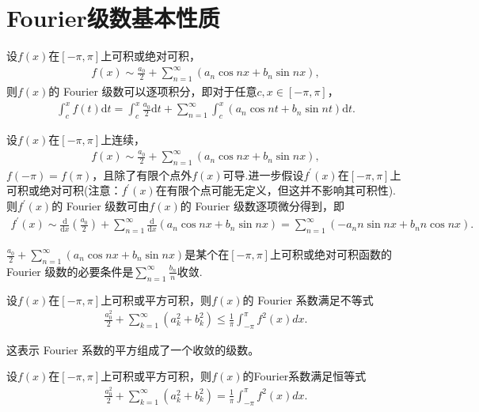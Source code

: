 \documentclass[../../main.tex]{subfiles}
\begin{document}
\section{Fourier级数基本性质}

\begin{theorem}[Fourier级数的逐项积分定理]\label{theorem:Fourier级数的逐项积分定理}
设$f(x)$在$[-\pi,\pi]$上可积或绝对可积，
\begin{align*}
f(x)\sim\frac{a_0}{2}+\sum_{n = 1}^{\infty}(a_n\cos nx + b_n\sin nx),
\end{align*}
则$f(x)$的 Fourier 级数可以逐项积分，即对于任意$c,x\in[-\pi,\pi]$，
\begin{align*}
\int_{c}^{x}f(t)\mathrm{d}t=\int_{c}^{x}\frac{a_0}{2}\mathrm{d}t+\sum_{n = 1}^{\infty}\int_{c}^{x}(a_n\cos nt + b_n\sin nt)\mathrm{d}t.
\end{align*}
\end{theorem}

\begin{theorem}[Fourier级数的逐项微分定理]\label{theorem:Fourier级数的逐项微分定理}
设$f(x)$在$[-\pi,\pi]$上连续，
\begin{align*}
f(x)\sim\frac{a_0}{2}+\sum_{n = 1}^{\infty}(a_n\cos nx + b_n\sin nx),
\end{align*}
$f(-\pi)=f(\pi)$，且除了有限个点外$f(x)$可导.进一步假设$f^{\prime}(x)$在$[-\pi,\pi]$上可积或绝对可积(注意：$f^{\prime}(x)$在有限个点可能无定义，但这并不影响其可积性). 则$f^{\prime}(x)$的 Fourier 级数可由$f(x)$的 Fourier 级数逐项微分得到，即
\begin{align*}
f^{\prime}(x)\sim\frac{\mathrm{d}}{\mathrm{d}x}\left(\frac{a_0}{2}\right)+\sum_{n = 1}^{\infty}\frac{\mathrm{d}}{\mathrm{d}x}(a_n\cos nx + b_n\sin nx)=\sum_{n = 1}^{\infty}(-a_nn\sin nx + b_nn\cos nx).
\end{align*}
\end{theorem}

\begin{corollary}
$\frac{a_0}{2}+\sum_{n = 1}^{\infty}(a_n\cos nx + b_n\sin nx)$是某个在$[-\pi,\pi]$上可积或绝对可积函数的 Fourier 级数的必要条件是$\sum_{n = 1}^{\infty}\frac{b_n}{n}$收敛. 
\end{corollary}

\begin{theorem}[Bessel不等式]\label{theorem:Bessel不等式}
设$f(x)$在$[-\pi,\pi]$上可积或平方可积，则$f(x)$的 Fourier 系数满足不等式
\begin{align*}
\frac{a_0^2}{2}+\sum_{k = 1}^{\infty}(a_k^2 + b_k^2)\leq\frac{1}{\pi}\int_{-\pi}^{\pi}f^2(x)dx.
\end{align*}
\end{theorem}
\begin{note}
这表示 Fourier 系数的平方组成了一个收敛的级数。
\end{note}

\begin{theorem}[Parseval恒等式]\label{theorem:Parseval恒等式}
设$f(x)$在$[-\pi,\pi]$上可积或平方可积，则$f(x)$的Fourier系数满足恒等式
\begin{align*}
\frac{a_0^2}{2}+\sum_{k = 1}^{\infty}(a_k^2 + b_k^2)=\frac{1}{\pi}\int_{-\pi}^{\pi}f^2(x)dx.
\end{align*}
\end{theorem}
\end{document}
